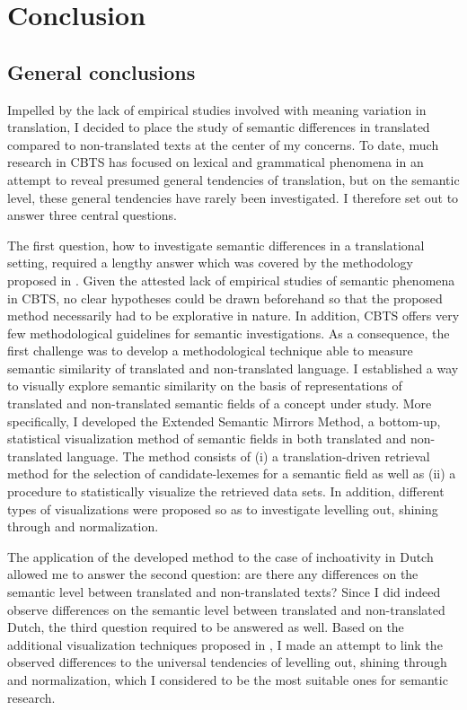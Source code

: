 \chapter{Conclusion}
\label{sec:6}
\section{General conclusions}
\label{sec:6.1}  
Impelled by the lack of empirical studies involved with meaning variation in translation, I decided to place the study of semantic differences in translated compared to non-translated texts at the center of my concerns. To date, much research in CBTS has focused on lexical and grammatical phenomena in an attempt to reveal presumed general tendencies of translation, but on the semantic level, these general tendencies have rarely been investigated. I therefore set out to answer three central questions.

The first question, how to investigate semantic differences in a translational setting, required a lengthy answer which was covered by the methodology proposed in . Given the attested lack of empirical studies of semantic phenomena in CBTS, no clear hypotheses could be drawn beforehand so that the proposed method necessarily had to be explorative in nature. In addition, CBTS offers very few methodological guidelines for semantic investigations. As a consequence, the first challenge was to develop a methodological technique able to measure semantic similarity of translated and non-translated language. I established a way to visually explore semantic similarity on the basis of representations of translated and non-translated semantic fields of a concept under study. More specifically, I developed the Extended Semantic Mirrors Method, a bottom-up, statistical visualization method of semantic fields in both translated and non-translated language. The method consists of (i) a translation-driven retrieval method for the selection of candidate-lexemes for a semantic field as well as (ii) a procedure to statistically visualize the retrieved data sets. In addition, different types of visualizations were proposed so as to investigate levelling out, shining through and normalization.

The application of the developed method to the case of inchoativity in Dutch allowed me to answer the second question: are there any differences on the semantic level between translated and non-translated texts? Since I did indeed observe differences on the semantic level between translated and non-translated Dutch, the third question required to be answered as well. Based on the additional visualization techniques proposed in , I made an attempt to link the observed differences to the universal tendencies of levelling out, shining through and normalization, which I considered to be the most suitable ones for semantic research.

